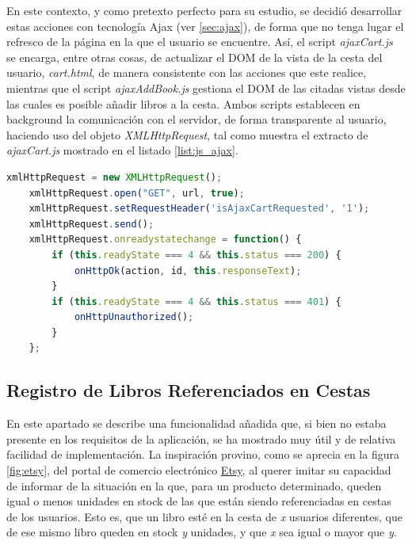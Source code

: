 \documentclass[a4paper]{article}
\begin{document}
    En este contexto, y como pretexto perfecto para su estudio, se decidió desarrollar estas acciones con tecnología Ajax (ver \ref{sec:ajax}), de forma que no tenga lugar el refresco de la página en la que el usuario se encuentre. Así, el script \emph{ajaxCart.js} se encarga, entre otras cosas, de actualizar el DOM de la vista de la cesta del usuario, \emph{cart.html}, de manera consistente con las acciones que este realice, mientras que el script \emph{ajaxAddBook.js} gestiona el DOM de las citadas vistas desde las cuales es posible añadir libros a la cesta. Ambos scripts establecen en background la comunicación con el servidor, de forma transparente al usuario, haciendo uso del objeto \emph{XMLHttpRequest}, tal como muestra el extracto de \emph{ajaxCart.js} mostrado en el listado \ref{list:js_ajax}.
    \\
    
    \begin{lstlisting}[language=JavaScript,caption=Comunicación Ajax con el servidor,label=list:js_ajax]
    xmlHttpRequest = new XMLHttpRequest();
    xmlHttpRequest.open("GET", url, true);
    xmlHttpRequest.setRequestHeader('isAjaxCartRequested', '1');
    xmlHttpRequest.send();
    xmlHttpRequest.onreadystatechange = function() {
    	if (this.readyState === 4 && this.status === 200) {
    		onHttpOk(action, id, this.responseText);
    	}
    	if (this.readyState === 4 && this.status === 401) {
    		onHttpUnauthorized();
    	}
    };
    \end{lstlisting}
    
    \subsection{Registro de Libros Referenciados en Cestas}
    En este apartado se describe una funcionalidad añadida que, si bien no estaba presente en los requisitos de la aplicación, se ha mostrado muy útil y de relativa facilidad de implementación. La inspiración provino, como se aprecia en la figura \ref{fig:etsy}, del portal de comercio electrónico \href{https://www.etsy.com}{Etsy}, al querer imitar su capacidad de informar de la situación en la que, para un producto determinado, queden igual o menos unidades en stock de las que están siendo referenciadas en cestas de los usuarios. Esto es, que un libro esté en la cesta de \emph{x} usuarios diferentes, que de ese mismo libro queden en stock \emph{y} unidades, y que \emph{x} sea igual o mayor que \emph{y}.
    
\end{document}
